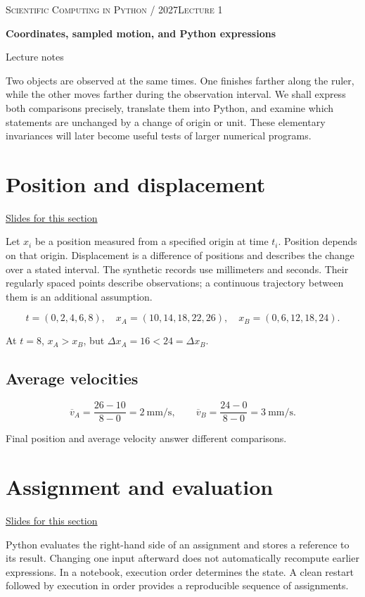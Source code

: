 \documentclass[11pt,letterpaper]{article}
\theoremstyle{definition}\newtheorem{definition}{Definition}\newtheorem{example}{Example}
\numberwithin{equation}{section}
\begin{document}
{\small\scshape Scientific Computing in Python / 2027\hfill Lecture 1}\par\medskip
{\raggedright{}\LARGE\bfseries\color{ink} Coordinates, sampled motion, and Python expressions\par}\medskip
{\small Lecture notes}\par\bigskip
Two objects are observed at the same times. One finishes farther along the ruler, while the other moves farther during the observation interval. We shall express both comparisons precisely, translate them into Python, and examine which statements are unchanged by a change of origin or unit. These elementary invariances will later become useful tests of larger numerical programs.

\section{Position and displacement}
\hypertarget{note-position-and-displacement}{}\label{note:position-and-displacement}
{\small \href{slides.html\#frame=position-and-displacement\&step=1}{Slides for this section}}\par
Let $x_i$ be a position measured from a specified origin at time $t_i$. Position depends on that origin. Displacement is a difference of positions and describes the change over a stated interval. The synthetic records use millimeters and seconds. Their regularly spaced points describe observations; a continuous trajectory between them is an additional assumption.

\[
t=(0,2,4,6,8),\quad x_A=(10,14,18,22,26),\quad x_B=(0,6,12,18,24).
\]

At $t=8$, $x_A>x_B$, but $\Delta x_A=16<24=\Delta x_B$.

\subsection*{Average velocities}
\[
\overline v_A=\frac{26-10}{8-0}=2\ \mathrm{mm/s},\qquad
\overline v_B=\frac{24-0}{8-0}=3\ \mathrm{mm/s}.
\]

Final position and average velocity answer different comparisons.
\section{Assignment and evaluation}
\hypertarget{note-assignment-and-evaluation}{}\label{note:assignment-and-evaluation}
{\small \href{slides.html\#frame=assignment-and-evaluation\&step=1}{Slides for this section}}\par
Python evaluates the right-hand side of an assignment and stores a reference to its result. Changing one input afterward does not automatically recompute earlier expressions. In a notebook, execution order determines the state. A clean restart followed by execution in order provides a reproducible sequence of assignments.
\end{document}

